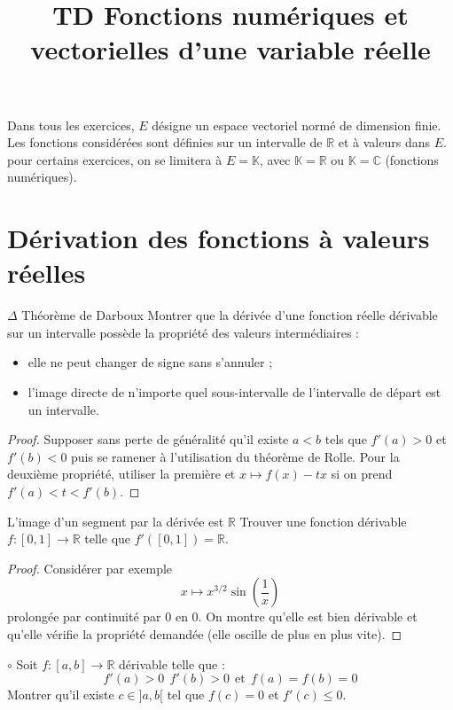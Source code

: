 \documentclass[french,a4paper]{article}
\title{TD Fonctions numériques et vectorielles d'une variable réelle}
\newcommand{\R}{\mathbb{R}}
\newcommand{\C}{\mathbb{C}}
\newcommand{\K}{\mathbb{K}}
\theoremstyle{plain}
\theoremstyle{definition}
\theoremstyle{remark}
\begin{document}
\maketitle

Dans tous les exercices, $E$ désigne un espace vectoriel normé de dimension finie. Les fonctions considérées sont définies sur un intervalle de $\R$ et à valeurs dans $E$. pour certains exercices, on se limitera à $E=\K$, avec $\K=\R$ ou $\K=\C$ (fonctions numériques).
\section{Dérivation des fonctions à valeurs réelles}

\begin{ex}[Moulin.FV.01]{$\Delta$ Théorème de Darboux}
	Montrer que la dérivée d'une fonction réelle dérivable sur un intervalle possède la propriété des valeurs intermédiaires :
	\begin{itemize}
		\item elle ne peut changer de signe sans s'annuler ;
		\item l'image directe de n'importe quel sous-intervalle de l'intervalle de départ est un intervalle.
	\end{itemize}
\end{ex}
\begin{proof}
	Supposer sans perte de généralité qu'il existe $a<b$ tels que $f'(a)>0$ et $f'(b)<0$ puis se ramener à l'utilisation du théorème de Rolle. Pour la deuxième propriété, utiliser la première et $x\mapsto f(x)-tx$ si on prend $f'(a)<t<f'(b)$.
\end{proof}

\begin{ex}[Moulin.FV.02]{L'image d'un segment par la dérivée est $\R$}
	Trouver une fonction dérivable $f:[0,1]\to\R$ telle que $f'([0,1])=\R$.
\end{ex}
\begin{proof}
	Considérer par exemple $$x\mapsto x^{3/2}\sin\left(\frac{1}{x}\right)$$ prolongée par continuité par $0$ en $0$. On montre qu'elle est bien dérivable et qu'elle vérifie la propriété demandée (elle oscille de plus en plus vite).
\end{proof}

\begin{ex}[Moulin.FV.03]{$\circ$}
	Soit $f:[a,b]\to\R$ dérivable telle que : $$f'(a)>0\ \ f'(b)>0\ \ \text{et}\ \ f(a)=f(b)=0$$ Montrer qu'il existe $c\in]a,b[$ tel que $f(c)=0$ et $f'(c)\leqslant 0$.
\end{ex}
\end{document}
